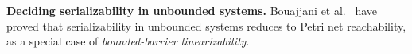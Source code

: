 \medskip
\noindent
\textbf{Deciding serializability in unbounded systems.} 
Bouajjani et al.~\cite{BoEmEnHa13} have proved that serializability in unbounded systems reduces to Petri net reachability, as a special case of \textit{bounded-barrier linearizability}.



%


